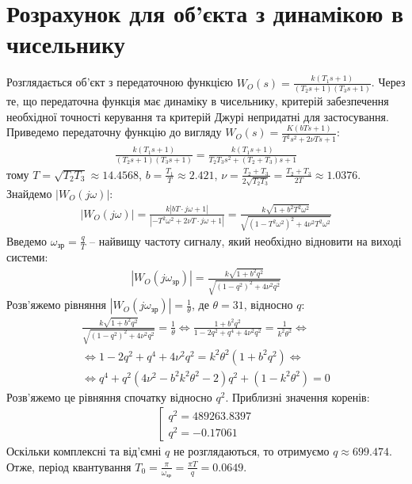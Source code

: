 \section{Розрахунок для об'єкта з динамікою в чисельнику}
Розглядається об'єкт з передаточною функцією $W_O(s) = \frac{
    k (T_1 s + 1)
}{
    (T_2 s + 1) (T_3 s + 1)
}$. Через те, що передаточна функція має динаміку в чисельнику, критерій забезпечення необхідної точності керування
та критерій Джурі непридатні для застосування. Приведемо передаточну функцію до вигляду
$W_O(s) = \frac{K (b T s + 1)}{T^2 s^2 + 2 \nu T s + 1}$:
\begin{gather*}
    \frac{
        k (T_1 s + 1)
    }{
        (T_2 s + 1) (T_3 s + 1)
    } = \frac{k (T_1 s + 1)}{T_2 T_3 s^2 + (T_2 + T_3) s + 1}
\end{gather*}
тому $T = \sqrt{T_2 T_3} \approx 14.4568$, $b = \frac{T_1}{T} \approx 2.421$, $\nu = \frac{T_2 + T_3}{2\sqrt{T_2 T_3}} = \frac{T_2 + T_3}{2T} \approx 1.0376$.
Знайдемо $\left|W_O (j \omega)\right|$:
\begin{gather*}
    \left|W_O (j \omega)\right| = \frac{
        k \left| bT \cdot j \omega + 1 \right|
    }{
        \left| -T^2 \omega^2 + 2\nu T \cdot j \omega + 1\right|
    } = 
    \frac{
        k \sqrt{1 + b^2 T^2 \omega^2}
    }{
        \sqrt{
            \left(1 - T^2 \omega^2\right)^2 + 4 \nu^2 T^2 \omega^2
        }
    }
\end{gather*}
Введемо $\omega_{\text{зр}} = \frac{q}{T}$ -- найвищу частоту сигналу, який необхідно відновити на виході системи:
\begin{gather*}
    \left|W_O (j \omega_{\text{зр}})\right| = 
    \frac{k\sqrt{1 + b^2 q^2}}{
        \sqrt{
            \left(1 - q^2\right)^2 + 4 \nu^2 q^2
        }
    }
\end{gather*}
Розв'яжемо рівняння $\left|W_O (j \omega_{\text{зр}})\right| = \frac{1}{\theta}$, де $\theta = 31$, відносно $q$:
\begin{gather*}
    \frac{k\sqrt{1 + b^2 q^2}}{
        \sqrt{
            \left(1 - q^2\right)^2 + 4 \nu^2 q^2
        }
    } = \frac{1}{\theta} \Leftrightarrow
    \frac{1 + b^2 q^2}{1 - 2 q^2 + q^4 + 4 \nu^2 q^2} = \frac{1}{k^2 \theta^2} \Leftrightarrow \\
    \Leftrightarrow 
    1 - 2 q^2 + q^4 + 4 \nu^2 q^2 = k^2 \theta^2 \left(1 + b^2 q^2\right) \Leftrightarrow \\
    \Leftrightarrow
    q^4 + q^2 \left(4 \nu^2 - b^2 k^2 \theta^2 - 2\right) q^2 + \left(1 - k^2 \theta^2\right) = 0
\end{gather*}
Розв'яжемо це рівняння спочатку відносно $q^2$. Приблизні значення коренів: 
\begin{gather*}
    \left[
        \begin{array}{ll}
            q^2 = 489263.8397 \\
            q^2 = -0.17061
        \end{array}
    \right.
\end{gather*}
Оскільки комплексні та від'ємні $q$ не розглядаються, то отримуємо $q \approx 699.474$.
Отже, період квантування $T_0 = \frac{\pi}{\omega_{\text{зр}}} = 
\frac{\pi T}{q} = 0.0649$.
